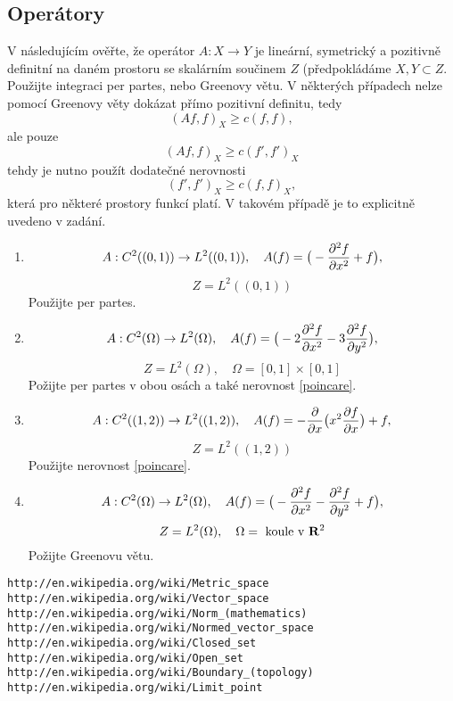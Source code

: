 \subsection{Operátory}
V následujícím ověřte, že operátor $A:X\to Y$ je lineární, symetrický a pozitivně definitní na daném prostoru
se skalárním součinem $Z$ (předpokládáme $X, Y \subset Z$. Použijte integraci per partes, nebo Greenovy větu. V některých případech nelze pomocí Greenovy věty dokázat přímo pozitivní definitu, tedy
\[
  (Af,f)_X \ge c(f,f),
\]
ale pouze
\[
  (Af,f)_X \ge c(f',f')_X
\]
tehdy je nutno použít dodatečné nerovnosti
\begin{equation}\label{poincare}
  (f',f')_X \ge c(f,f)_X,
\end{equation}
která pro některé prostory funkcí platí. V takovém případě je to explicitně uvedeno v zadání.

\begin{enumerate}
\item 
\[
A:C^2((0,1))\rightarrow L^2((0,1)),\quad A(f)=\big(-\frac{\partial^2 f}{\partial x^2} +f \big),
\]
\[ Z=L^2((0,1)) \]
Použijte per partes.
\item 
\[
A:C^2(\Omega)\rightarrow L^2(\Omega),\quad A(f)=\big(-2\frac{\partial^2 f}{\partial x^2} -3 \frac{\partial^2 f}{\partial y^2} \big),
\]
\[ Z=L^2(\Omega),\quad \Omega=[0,1]\times[0,1] \]
Požijte per partes v obou osách a také nerovnost \eqref{poincare}. 
\item
\[
A:C^2((1,2))\rightarrow L^2((1,2)),\quad A(f)=-\frac{\partial }{\partial x}\big( x^2 \frac{\partial f}{\partial x} \big)+ f,
\]
\[ Z=L^2((1,2))\]
Použijte nerovnost \eqref{poincare}.
\item 
\[
A:C^2(\Omega)\rightarrow L^2(\Omega),\quad A(f)=\big(-\frac{\partial^2 f}{\partial x^2} -\frac{\partial^2 f}{\partial y^2} + f \big),
\]
\[ Z=L^2(\Omega),\quad \Omega= \text{  koule v }{\rm\bf R}^2\]
Požijte Greenovu větu.


\end{enumerate}



\begin{verbatim}
http://en.wikipedia.org/wiki/Metric_space
http://en.wikipedia.org/wiki/Vector_space
http://en.wikipedia.org/wiki/Norm_(mathematics)
http://en.wikipedia.org/wiki/Normed_vector_space
http://en.wikipedia.org/wiki/Closed_set
http://en.wikipedia.org/wiki/Open_set
http://en.wikipedia.org/wiki/Boundary_(topology)
http://en.wikipedia.org/wiki/Limit_point
\end{verbatim}


